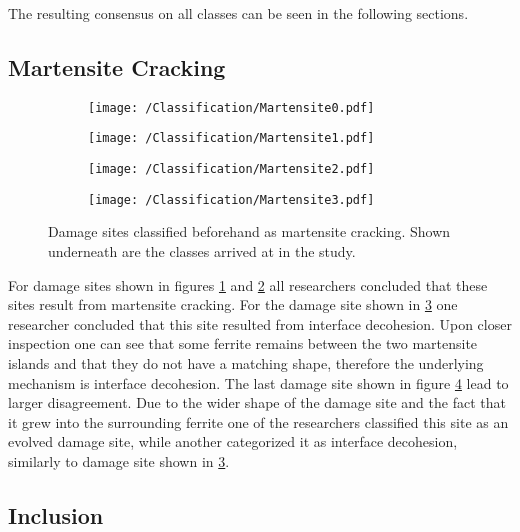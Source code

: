 The resulting consensus on all classes can be seen in the following sections. 

\subsection{Martensite Cracking}

\begin{figure}[H]
\begin{subfigure}{.25\textwidth}
\centering
  \texttt{[image: /Classification/Martensite0.pdf]}
  \caption{}
  \label{fig:MC1}
\end{subfigure}%
\begin{subfigure}{.25\textwidth}
\centering
  \texttt{[image: /Classification/Martensite1.pdf]}
  \caption{}
  \label{fig:MC2}
\end{subfigure}%
\centering
\begin{subfigure}{.25\textwidth}
\centering
  \texttt{[image: /Classification/Martensite2.pdf]}
  \caption{}
  \label{fig:MC3}
\end{subfigure}%
\begin{subfigure}{.25\textwidth}
\centering
  \texttt{[image: /Classification/Martensite3.pdf]}
  \caption{}
  \label{fig:MC4}
\end{subfigure}%
\caption{Damage sites classified beforehand as martensite cracking. Shown underneath are the classes arrived at in the study.}
\label{fig:classes}
\end{figure}

For damage sites shown in figures \ref{fig:MC1} and \ref{fig:MC2} all researchers concluded that these sites result from martensite cracking. For the damage site shown in \ref{fig:MC3} one researcher concluded that this site resulted from interface decohesion. Upon closer inspection one can see that some ferrite remains between the two martensite islands and that they do not have a matching shape, therefore the underlying mechanism is interface decohesion. The last damage site shown in figure \ref{fig:MC4} lead to larger disagreement. Due to the wider shape of the damage site and the fact that it grew into the surrounding ferrite one of the researchers classified this site as an evolved damage site, while another categorized it as interface decohesion, similarly to damage site shown in \ref{fig:MC3}. 

\subsection{Inclusion}

